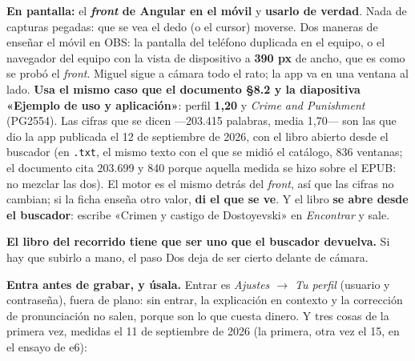 \documentclass[11pt,a4paper]{article}
\begin{document}
\begin{ve}
\textbf{En pantalla:} el \textbf{\emph{front} de Angular en el móvil} y
\textbf{usarlo de verdad}. Nada de capturas pegadas: que se vea el dedo (o el
cursor) moverse. Dos maneras de enseñar el móvil en OBS: la pantalla del
teléfono duplicada en el equipo, o el navegador del equipo con la vista de
dispositivo a \textbf{390 px} de ancho, que es como se probó el \emph{front}.
Miguel sigue a cámara todo el rato; la app va en una ventana al lado.
\textbf{Usa el mismo caso que el documento §8.2 y la diapositiva «Ejemplo de
uso y aplicación»}: perfil \textbf{1,20} y \emph{Crime and Punishment}
(PG2554). Las cifras que se dicen ---203.415 palabras, media 1,70--- son las
que dio la app publicada el 12 de septiembre de 2026, con el libro abierto
desde el buscador (en \texttt{.txt}, el mismo texto con el que se midió el
catálogo, 836 ventanas; el documento cita 203.699 y 840 porque aquella medida
se hizo sobre el EPUB: no mezclar las dos). El motor es el mismo detrás del
\emph{front}, así que las cifras no cambian; si la ficha enseña otro valor,
\textbf{di el que se ve}. Y el libro \textbf{se abre desde el buscador}: escribe
«Crimen y castigo de Dostoyevski» en \emph{Encontrar} y sale.

\textbf{El libro del recorrido tiene que ser uno que el buscador devuelva.}
Si hay que subirlo a mano, el paso Dos deja de ser cierto delante de cámara.

\textbf{Entra antes de grabar, y úsala.} Entrar es \emph{Ajustes
$\rightarrow$ Tu perfil} (usuario y contraseña), fuera de plano: sin entrar, la explicación en
contexto y la corrección de pronunciación no salen, porque son lo que cuesta
dinero. Y tres cosas de la primera vez, medidas el 11 de septiembre de 2026 (la
primera, otra vez el 15, en el ensayo de e6):


\end{ve}
\end{document}
